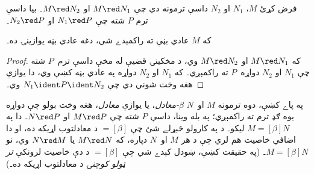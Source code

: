 \documentclass[../../../include/open-logic-section]{subfiles}
\begin{document}

\begin{thm}
فرض کړئ $M$، $N_1$ او $N_2$ داسې ترمونه دي چې $M \red N_1$ او
$M \red N_2$۔ بيا داسې ترم $P$ شته چې $N_1 \red P$ او $N_2 \red P$۔
\end{thm}

\begin{cor}
که $M$ عادي بڼې ته راکمېدے شي، دغه عادي بڼه يوازينۍ ده۔
\end{cor}

\begin{proof}
که $M \red N_1$ او $M \red N_2$ وي، د مخکينۍ قضيې له مخې داسې
ترم~$P$ شته چې $N_1$ او $N_2$ دواړه~$P$ ته راکمېږي۔ که $N_1$ او
$N_2$ دواړه په عادي بڼه کښې وي، دا يوازې هغه وخت شوني دي چې
$N_1 \ident P \ident N_2$ وي۔
\end{proof}

په پاے کښې، دوه ترمونه $M$ او~$N$ \emph{$\beta$-معادل}، يا يوازې
\emph{معادل}، هغه وخت بولو چې دواړه يوه ګډ ترم ته راکمېږي؛ په بله
وينا، داسې $P$ شته چې $M \red P$ او $N \red P$۔ دا په
$M \equal[\beta] N$ ليکو۔ د  په کارولو
څېړلے شئ چې $\equal[\beta]$ د معادلتوب اړيکه ده، او دا اضافي
خاصيت هم لري چې د هر $M$ او~$N$ دپاره، که $M \red N$ يا
$N \red M$ وي، نو $M \equal[\beta] N$۔ (په حقيقت کښې، ښودل کېدے
شي چې $\equal[\beta]$ د دې خاصيت لرونکې \emph{تر ټولو کوچنۍ}
د معادلتوب اړيکه ده۔)
\end{document}

